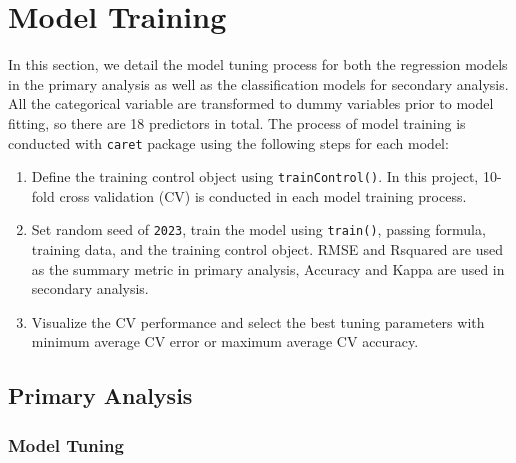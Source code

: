 \documentclass[11pt]{article}
\begin{document}
\section{Model Training}

In this section, we detail the model tuning process for both the regression models in the primary analysis as well as the classification models for secondary analysis. All the categorical variable are transformed to dummy variables prior to model fitting, so there are 18 predictors in total. The process of model training is conducted with \texttt{caret} package using the following steps for each model:
\begin{enumerate}
\item Define the training control object using \texttt{trainControl()}. In this project, 10-fold cross validation (CV) is conducted in each model training process.
\item Set random seed of \texttt{2023}, train the model using \texttt{train()}, passing formula, training data, and the training control object. RMSE and Rsquared are used as the summary metric in primary analysis, Accuracy and Kappa are used in secondary analysis.
\item Visualize the CV performance and select the best tuning parameters with minimum average CV error or maximum average CV accuracy.
\end{enumerate}

\subsection{Primary Analysis}

\subsubsection{Model Tuning}
\end{document}
